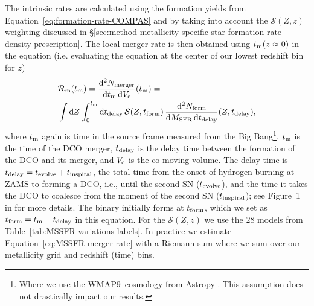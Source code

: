 \documentclass[fleqn,usenatbib]{mnras}
\newcommand\rate{\mathcal{R}}
\newcommand{\Zi}{\ensuremath{Z}\xspace}
\newcommand{\MSFR}{\ensuremath{{M}_{\rm{SFR}}}\xspace}
\newcommand{\SFRD}{\ensuremath{\mathcal{S}(Z,z)}\xspace}
\newcommand{\tdelay}{\ensuremath{{t}_{\rm{delay}}}\xspace}
\newcommand{\tevolve}{\ensuremath{{t}_{\rm{evolve}}}\xspace}
\newcommand{\tform}{\ensuremath{{t}_{\rm{form}}}\xspace}
\newcommand{\tmerger}{\ensuremath{{t}_{\rm{m}}}\xspace}
\newcommand{\tinspiral}{\ensuremath{{t}_{\rm{inspiral}}}\xspace}
\newcommand{\Nform}{\ensuremath{{N}_{\rm{form}}}\xspace}
\newcommand{\Nmerger}{\ensuremath{{N}_{\rm{merger}}}\xspace}
\newcommand{\Vc}{\ensuremath{{V}_{\rm{c}}}\xspace}
\newcommand*\diff{\mathop{}\!\mathrm{d}}
\newcommand{\NmodelsMSSFR}{\ensuremath{28}\xspace}
\begin{document}
The intrinsic rates are calculated using the formation yields from Equation~\ref{eq:formation-rate-COMPAS} and by taking into account the \SFRD weighting discussed in \S\ref{sec:method-metallicity-specific-star-formation-rate-density-prescription}. The local merger rate is then obtained using $\tmerger(z\approx0)$ in the equation (i.e. evaluating the equation at the center of our lowest redshift bin for $z$)
%
\begin{align}
%
&\rate_{\rm{m}} (\tmerger) = \frac{\diff^2 \Nmerger }{\diff \tmerger \diff \Vc } (\tmerger) = \notag \\
%
		&\int \diff \Zi  \int_0^{\tmerger} \diff \tdelay \, {\mathcal{S}}(\Zi, \tform) \,  \frac{\diff^2 \Nform}{\diff \MSFR  \diff \tdelay} (\Zi, \tdelay),  
%
\label{eq:MSSFR-merger-rate}
\end{align}
%
where \tmerger again is time in the source frame measured from the Big Bang\footnote{Where we use the WMAP9--cosmology from Astropy \citep{2013ApJS..208...19H}. This assumption does not drastically impact our results.}, \tmerger is the time of the \ac{DCO} merger, \tdelay is the delay time between the formation of the \ac{DCO} and its merger, and \Vc is the co-moving volume. The delay time is $\tdelay = \tevolve+ \tinspiral$, the total time from the onset of hydrogen burning at ZAMS to forming a \ac{DCO}, i.e., until the second SN (\tevolve), and the time it takes the \ac{DCO} to coalesce from the moment of the second \ac{SN} (\tinspiral); see Figure~1 in   for more details. The binary initially forms at $\tform$, which we set as $\tform = \tmerger - \tdelay$ in this equation.  For the \SFRD we use the \NmodelsMSSFR models from Table~\ref{tab:MSSFR-variations-labels}. In practice we estimate Equation~\ref{eq:MSSFR-merger-rate} with a Riemann sum where we sum over our metallicity grid and redshift (time) bins.  
\end{document}

